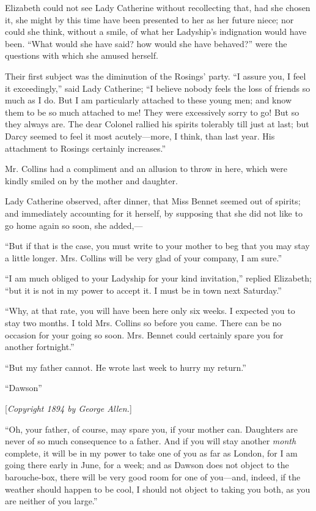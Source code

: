 \documentclass[12pt,openright]{book}
\begin{document}
Elizabeth could not see Lady Catherine without recollecting that, had she chosen it, she might by this time have been presented to her as her future niece; nor could she think, without a smile, of what her Ladyship’s indignation would have been. “What would she have said? how would she have behaved?” were the questions with which she amused herself.

Their first subject was the diminution of the Rosings’ party. “I assure you, I feel it exceedingly,” said Lady Catherine; “I believe nobody feels the loss of friends so much as I do. But I am particularly attached to these young men; and know them to be so much attached to me! They were excessively sorry to go! But so they always are. The dear Colonel rallied his spirits tolerably till just at last; but Darcy seemed to feel it most acutely—more, I think, than last year. His attachment to Rosings certainly increases.”

Mr. Collins had a compliment and an allusion to throw in here, which were kindly smiled on by the mother and daughter.

Lady Catherine observed, after dinner, that Miss Bennet seemed out of spirits; and immediately accounting for it herself, by supposing that she did not like to go home again so soon, she added,—

“But if that is the case, you must write to your mother to beg that you may stay a little longer. Mrs. Collins will be very glad of your company, I am sure.”

“I am much obliged to your Ladyship for your kind invitation,” replied Elizabeth; “but it is not in my power to accept it. I must be in town next Saturday.”

“Why, at that rate, you will have been here only six weeks. I expected you to stay two months. I told Mrs. Collins so before you came. There can be no occasion for your going so soon. Mrs. Bennet could certainly spare you for another fortnight.”

“But my father cannot. He wrote last week to hurry my return.”

“Dawson”


[\textit{Copyright 1894 by George Allen.}]

“Oh, your father, of course, may spare you, if your mother can. Daughters are never of so much consequence to a father. And if you will stay another \textit{month} complete, it will be in my power to take one of you as far as London, for I am going there early in June, for a week; and as Dawson does not object to the barouche-box, there will be very good room for one of you—and, indeed, if the weather should happen to be cool, I should not object to taking you both, as you are neither of you large.”
\end{document}
